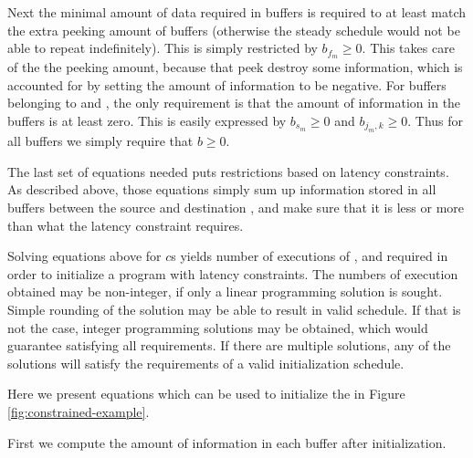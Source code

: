 Next the minimal amount of data required in buffers is required to
at least match the extra peeking amount of buffers (otherwise the
steady schedule would not be able to repeat indefinitely).  This
is simply restricted by $b_{f_m} \ge 0$.  This takes care of the
the peeking amount, because {\filters} that peek destroy some
information, which is accounted for by setting the amount of
information to be negative. For buffers belonging to {\splitters}
and {\joiners}, the only requirement is that the amount of
information in the buffers is at least zero.  This is easily
expressed by $b_{s_m} \ge 0$ and $b_{j_m, k} \ge 0$.  Thus for all
buffers we simply require that $b \ge 0$.

The last set of equations needed puts restrictions based on
latency constraints.  As described above, those equations simply
sum up information stored in all buffers between the source and
destination {\filters}, and make sure that it is less or more than
what the latency constraint requires.

Solving equations above for $c$s yields number of executions of
{\filters}, {\splitters} and {\joiners} required in order to initialize
a {\StreamIt} program with latency constraints.  The numbers of
execution obtained may be non-integer, if only a linear
programming solution is sought. Simple rounding of the solution
may be able to result in valid schedule.  If that is not the case,
integer programming solutions may be obtained, which would
guarantee satisfying all requirements.  If there are multiple
solutions, any of the solutions will satisfy the requirements of a
valid initialization schedule.

\begin{comment}
Since the system of equations should be under-specified, it is may
be beneficial to add an additional requirement to the system. For
example, minimizing the number of executions of {\filters} or amount
of information or data buffered may be a useful metric to optimize
for.
\end{comment}


Here we present equations which can be used to initialize the
{\pipeline} in Figure \ref{fig:constrained-example}.

First we compute the amount of information in each buffer after
initialization.

